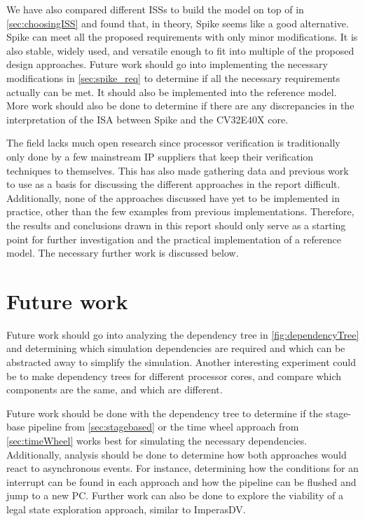 We have also compared different ISSs to build the model on top of in \cref{sec:choosingISS} and found that, in theory, Spike seems like a good alternative. Spike can meet all the proposed requirements with only minor modifications. It is also stable, widely used, and versatile enough to fit into multiple of the proposed design approaches. Future work should go into implementing the necessary modifications in \cref{sec:spike_req} to determine if all the necessary requirements actually can be met. It should also be implemented into the reference model. More work should also be done to determine if there are any discrepancies in the interpretation of the ISA between Spike and the CV32E40X core. 

The field lacks much open research since processor verification is traditionally only done by a few mainstream IP suppliers that keep their verification techniques to themselves. This has also made gathering data and previous work to use as a basis for discussing the different approaches in the report difficult. Additionally, none of the approaches discussed have yet to be implemented in practice, other than the few examples from previous implementations. Therefore, the results and conclusions drawn in this report should only serve as a starting point for further investigation and the practical implementation of a reference model. The necessary further work is discussed below.

\section{Future work}
\label{sec:futureWork}

Future work should go into analyzing the dependency tree in \cref{fig:dependencyTree} and determining which simulation dependencies are required and which can be abstracted away to simplify the simulation. Another interesting experiment could be to make dependency trees for different processor cores, and compare which components are the same, and which are different.

Future work should be done with the dependency tree to determine if the stage-base pipeline from \cref{sec:stagebased} or the time wheel approach from \cref{sec:timeWheel} works best for simulating the necessary dependencies. Additionally, analysis should be done to determine how both approaches would react to asynchronous events. For instance, determining how the conditions for an interrupt can be found in each approach and how the pipeline can be flushed and jump to a new PC.
Further work can also be done to explore the viability of a legal state exploration approach, similar to ImperasDV.


